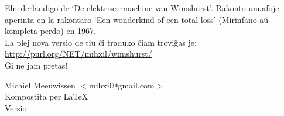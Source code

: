 \begin{minipage}[t]{\textwidth}
Elnederlandigo de `De elektriseermachine van Wimshurst'.  Rakonto unuafoje aperinta en la rakontaro `Een wonderkind of een total loss'
(Mirinfano a\u{u} kompleta perdo) en 1967.\\

La plej nova versio de tiu \^ci traduko \^ciam trovi\^gas je:\\
\href{http://purl.org/NET/mihxil/wimshurst/}{http://purl.org/NET/mihxil/wimshurst/}\\

\^Gi ne jam pretas!

Michiel  Meeuwissen $<$mihxil@gmail.com$>$\\

Kompostita per \LaTeX\\
Versio: 
\end{minipage}
\newpage
\pagestyle{plain}
\setcounter{page}{1}
